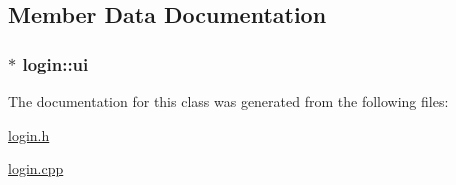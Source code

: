 \subsection{Member Data Documentation}
\hypertarget{classlogin_ab08986017bf8d41e5cbab46dd0492d38}{
\subsubsection[{ui}]{$\ast$ login\-::ui\hspace{0.3cm}{\ttfamily [private]}}}\label{classlogin_ab08986017bf8d41e5cbab46dd0492d38}


The documentation for this class was generated from the following files\-:\begin{DoxyCompactItemize}
\item 
\hyperlink{login_8h}{login.\-h}\item 
\hyperlink{login_8cpp}{login.\-cpp}\end{DoxyCompactItemize}
